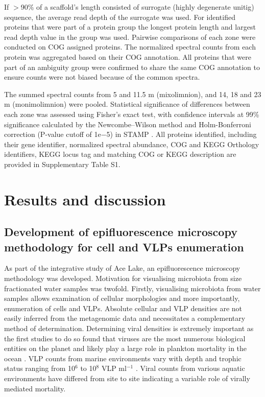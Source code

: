 If $>$90\% of a scaffold’s length consisted of surrogate (highly degenerate unitig) sequence, the average read depth of the surrogate was used. 
For identified proteins that were part of a protein group the longest protein length and largest read depth value in the group was used. 
Pairwise comparisons of each zone were conducted on COG assigned proteins. 
The normalized spectral counts from each protein was aggregated based on their \ac{COG} annotation. 
All proteins that were part of an ambiguity group were confirmed to share the same \ac{COG} annotation to ensure counts were not biased because of the common spectra.

The summed spectral counts from 5 and 11.5 m (mixolimnion), and 14, 18 and 23 m (monimolimnion) were pooled. 
Statistical significance of differences between each zone was assessed using Fisher's exact test, with confidence intervals at 99\% significance calculated by the Newcombe–Wilson method and Holm-Bonferroni correction (P-value cutoff of 1e$-$5) in \ac{STAMP} \cite{Parks2010}. 
All proteins identified, including their gene identifier, normalized spectral abundance, \ac{COG} and \ac{KEGG} Orthology identifiers, \ac{KEGG} locus tag and matching \ac{COG} or \ac{KEGG} description are provided in Supplementary Table S1.




\section{Results and discussion}

\subsection[Epifluorescence microscopy methodology]{Development of epifluorescence microscopy methodology for cell and \acp{VLP} enumeration}
As part of the integrative study of Ace Lake, an epifluorescence microscopy methodology was developed.
Motivation for visualising microbiota from size fractionated water samples was twofold. 
Firstly, visualising microbiota from water samples allows examination of cellular morphologies and more importantly, enumeration of cells and \acp{VLP}.
Absolute cellular and \ac{VLP} densities are not easily inferred from the metagenomic data and necessitates a complementary method of determination.
Determining viral densities is extremely important as the first studies to do so found that viruses are the most numerous biological entities on the planet and likely play a large role in plankton mortality in the ocean \cite{Bergh1989,Proctor1990}. %
\ac{VLP} counts from marine environments vary with depth and trophic status ranging from 10$^6$ to 10$^8$ \acs{VLP} ml$^{-1}$ \cite{Suttle2005}. %
Viral counts from various aquatic environments have differed from site to site indicating a variable role of virally mediated mortality. %


